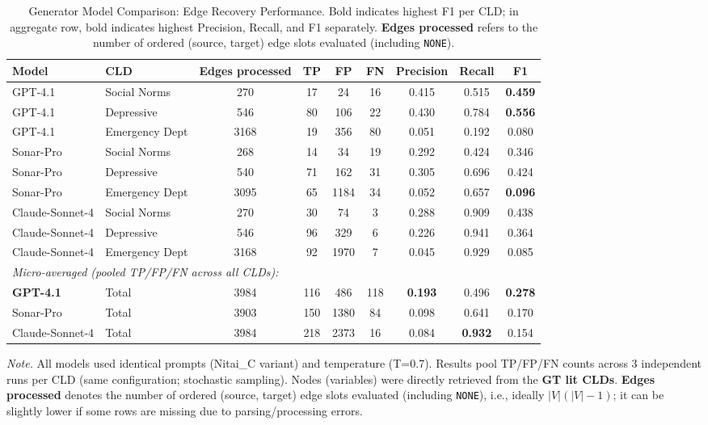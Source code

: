 \begin{table}[H]
\centering
\caption{Generator Model Comparison: Edge Recovery Performance. Bold indicates highest F1 per CLD; in aggregate row, bold indicates highest Precision, Recall, and F1 separately. \textbf{Edges processed} refers to the number of ordered (source, target) edge slots evaluated (including \texttt{NONE}).}
\label{tab:generator_model_comparison}
\begin{threeparttable}
\begin{tabular}{llccccccc}
\toprule
\textbf{Model} & \textbf{CLD} & \textbf{Edges processed} & \textbf{TP} & \textbf{FP} & \textbf{FN} & \textbf{Precision} & \textbf{Recall} & \textbf{F1} \\
\midrule
GPT-4.1 & Social Norms & 270 & 17 & 24 & 16 & 0.415 & 0.515 & \textbf{0.459} \\
GPT-4.1 & Depressive & 546 & 80 & 106 & 22 & 0.430 & 0.784 & \textbf{0.556} \\
GPT-4.1 & Emergency Dept & 3168 & 19 & 356 & 80 & 0.051 & 0.192 & 0.080 \\
\midrule
Sonar-Pro & Social Norms & 268 & 14 & 34 & 19 & 0.292 & 0.424 & 0.346 \\
Sonar-Pro & Depressive & 540 & 71 & 162 & 31 & 0.305 & 0.696 & 0.424 \\
Sonar-Pro & Emergency Dept & 3095 & 65 & 1184 & 34 & 0.052 & 0.657 & \textbf{0.096} \\
\midrule
Claude-Sonnet-4 & Social Norms & 270 & 30 & 74 & 3 & 0.288 & 0.909 & 0.438 \\
Claude-Sonnet-4 & Depressive & 546 & 96 & 329 & 6 & 0.226 & 0.941 & 0.364 \\
Claude-Sonnet-4 & Emergency Dept & 3168 & 92 & 1970 & 7 & 0.045 & 0.929 & 0.085 \\
\midrule
\multicolumn{9}{l}{\textit{Micro-averaged (pooled TP/FP/FN across all CLDs):}} \\
\textbf{GPT-4.1} & Total & 3984 & 116 & 486 & 118 & \textbf{0.193} & 0.496 & \textbf{0.278} \\
Sonar-Pro & Total & 3903 & 150 & 1380 & 84 & 0.098 & 0.641 & 0.170 \\
Claude-Sonnet-4 & Total & 3984 & 218 & 2373 & 16 & 0.084 & \textbf{0.932} & 0.154 \\
\bottomrule
\end{tabular}
\begin{tablenotes}
\small
\item \textit{Note.} All models used identical prompts (Nitai\_C variant) and temperature (T=0.7). Results pool TP/FP/FN counts across 3 independent runs per CLD (same configuration; stochastic sampling). Nodes (variables) were directly retrieved from the \textbf{GT lit CLDs}. \textbf{Edges processed} denotes the number of ordered (source, target) edge slots evaluated (including \texttt{NONE}), i.e., ideally $|V|(|V|-1)$; it can be slightly lower if some rows are missing due to parsing/processing errors.

\end{tablenotes}
\end{threeparttable}
\end{table}
